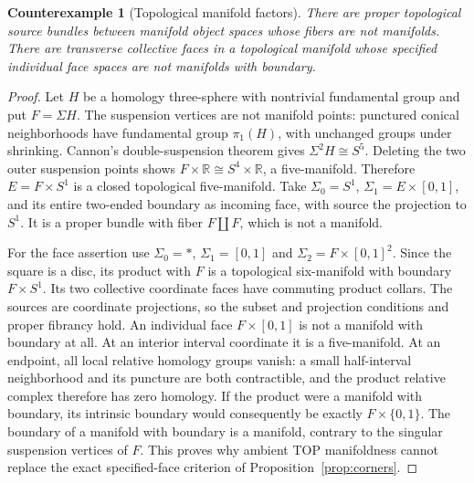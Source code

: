 \documentclass[11pt,a4paper]{article}
\newtheorem{counterexample}[theorem]{Counterexample}
\theoremstyle{definition}
\newcommand{\R}{\mathbb R}
\begin{document}
\begin{counterexample}[Topological manifold factors]\label{ex:cannon}
There are proper topological source bundles between manifold object
spaces whose fibers are not manifolds. There are transverse collective
faces in a topological manifold whose specified individual face spaces
are not manifolds with boundary.
\end{counterexample}
\begin{proof}
Let $H$ be a homology three-sphere with nontrivial fundamental group
and put $F=\Sigma H$. The suspension vertices are not manifold points:
punctured conical neighborhoods have fundamental group $\pi_1(H)$,
with unchanged groups under shrinking. Cannon's double-suspension
theorem \cite[Theorem~1.5, p.~833]{Cannon} gives
$\Sigma^2H\cong S^5$. Deleting the two outer suspension points shows
$F\times\R\cong S^4\times\R$, a five-manifold. Therefore
$E=F\times S^1$ is a closed topological five-manifold.
Take $\Sigma_0=S^1$, $\Sigma_1=E\times[0,1]$, and its entire two-ended
boundary as incoming face, with source the projection to $S^1$.
It is a proper bundle with fiber $F\amalg F$, which is not a manifold.

For the face assertion use $\Sigma_0=*$, $\Sigma_1=[0,1]$ and
$\Sigma_2=F\times[0,1]^2$. Since the square is a disc, its product
with $F$ is a topological six-manifold with boundary
$F\times S^1$. Its two collective coordinate faces have commuting
product collars. The sources are coordinate projections, so the subset
and projection conditions and proper fibrancy hold. An individual face
$F\times[0,1]$ is not a manifold with boundary at all. At an interior
interval coordinate it is a five-manifold. At an endpoint, all local
relative homology groups vanish: a small half-interval neighborhood
and its puncture are both contractible, and the product relative
complex therefore has zero homology. If the product were a manifold
with boundary, its intrinsic boundary would consequently be exactly
$F\times\{0,1\}$. The boundary of a manifold with boundary is a
manifold, contrary to the singular suspension vertices of $F$.
This proves why ambient TOP manifoldness cannot replace the exact
specified-face criterion of Proposition~\ref{prop:corners}.
\end{proof}
\end{document}
